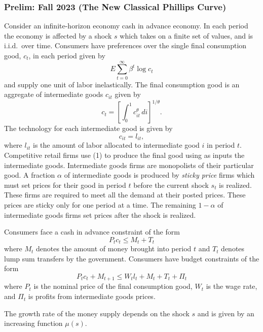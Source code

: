 \documentclass[11pt,english]{article}
\begin{document}
\subsubsection{Prelim: Fall 2023 (The New Classical Phillips Curve)}
Consider an infinite-horizon economy cash in advance economy. In each period
the economy is affected by a shock $s$ which takes on a finite set of values,
and is i.i.d.\ over time. Consumers have preferences over the single final
consumption good, $c_t$, in each period given by
\[
    E\sum_{t=0}^{\infty} \beta^t \log c_t
\]
and supply one unit of labor inelastically. The final consumption good is an
aggregate of intermediate goods $c_{it}$ given by
\begin{equation}
    c_t = \left[\int_0^1 c_{it}^{\theta}\,di\right]^{1/\theta}.
\end{equation}
The technology for each intermediate good is given by
\begin{equation}
    c_{it} = l_{it},
\end{equation}
where $l_{it}$ is the amount of labor allocated to intermediate good $i$ in
period $t$. Competitive retail firms use (1) to produce the final good using
as inputs the intermediate goods. Intermediate goods firms are monopolists of
their particular good. A fraction $\alpha$ of intermediate goods is produced by
\textit{sticky price} firms which must set prices for their good in period $t$
before the current shock $s_t$ is realized. These firms are required to meet
all the demand at their posted prices. These prices are sticky only for one
period at a time. The remaining $1 - \alpha$ of intermediate goods firms set
prices after the shock is realized.
 
Consumers face a cash in advance constraint of the form
\begin{equation}
    P_t c_t \leq M_t + T_t
\end{equation}
where $M_t$ denotes the amount of money brought into period $t$ and $T_t$
denotes lump sum transfers by the government. Consumers have budget constraints
of the form
\[
    P_t c_t + M_{t+1} \leq W_t l_t + M_t + T_t + \Pi_t
\]
where $P_t$ is the nominal price of the final consumption good, $W_t$ is the
wage rate, and $\Pi_t$ is profits from intermediate goods prices.
 
The growth rate of the money supply depends on the shock $s$ and is given by
an increasing function $\mu(s)$.
 
\end{document}
